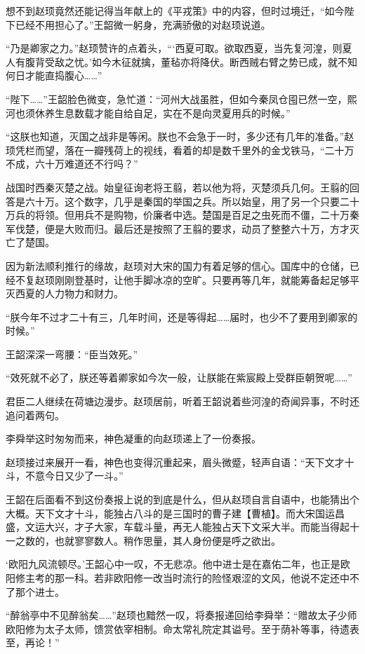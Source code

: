 想不到赵顼竟然还能记得当年献上的《平戎策》中的内容，但时过境迁，“如今陛下已经不用担心了。”王韶微一躬身，充满骄傲的对赵顼说道。

“乃是卿家之力。”赵顼赞许的点着头，“‘西夏可取。欲取西夏，当先复河湟，则夏人有腹背受敌之忧。’如今木征就擒，董毡亦将降伏。断西贼右臂之势已成，就不知何日才能直捣腹心……”

“陛下……”王韶脸色微变，急忙道：“河州大战虽胜，但如今秦凤仓囤已然一空，熙河也须休养生息数载才能自给自足，实在不是向灵夏用兵的时候。”

“这朕也知道，灭国之战非是等闲。朕也不会急于一时，多少还有几年的准备。”赵顼凭栏而望，落在一瓣残荷上的视线，看着的却是数千里外的金戈铁马，“二十万不成，六十万难道还不行吗？”

战国时西秦灭楚之战。始皇征询老将王翦，若以他为将，灭楚须兵几何。王翦的回答是六十万。这个数字，几乎是秦国的举国之兵。所以始皇，用了另一个只要二十万兵的将领。但用兵不是购物，价廉者中选。楚国是百足之虫死而不僵，二十万秦军伐楚，便是大败而归。最后还是按照了王翦的要求，动员了整整六十万，方才灭亡了楚国。

因为新法顺利推行的缘故，赵顼对大宋的国力有着足够的信心。国库中的仓储，已经不复赵顼刚刚登基时，让他手脚冰凉的空旷。只要再等几年，就能筹备起足够平灭西夏的人力物力和财力。

“朕今年不过才二十有三，几年时间，还是等得起……届时，也少不了要用到卿家的时候。”

王韶深深一弯腰：“臣当效死。”

“效死就不必了，朕还等着卿家如今次一般，让朕能在紫宸殿上受群臣朝贺呢……”

君臣二人继续在荷塘边漫步。赵顼居前，听着王韶说着些河湟的奇闻异事，不时还追问着两句。

李舜举这时匆匆而来，神色凝重的向赵顼递上了一份奏报。

赵顼接过来展开一看，神色也变得沉重起来，眉头微蹙，轻声自语：“天下文才十斗，不意今日又少了一斗。”

王韶在后面看不到这份奏报上说的到底是什么，但从赵顼自言自语中，也能猜出个大概。天下文才十斗，能独占八斗的是三国时的曹子建【曹植】。而大宋国运昌盛，文运大兴，才子大家，车载斗量，再无人能独占天下文采大半。而能当得起十一之数的，也就寥寥数人。稍作思量，其人身份便是呼之欲出。

‘欧阳九风流顿尽。’王韶心中一叹，不无悲凉。他中进士是在嘉佑二年，也正是欧阳修主考的那一科。若非欧阳修一改当时流行的险怪艰涩的文风，他说不定还中不了那个进士。

“醉翁亭中不见醉翁矣……”赵顼也黯然一叹，将奏报递回给李舜举：“赠故太子少师欧阳修为太子太师，馈赏依宰相制。命太常礼院定其谥号。至于荫补等事，待遗表至，再论！”


